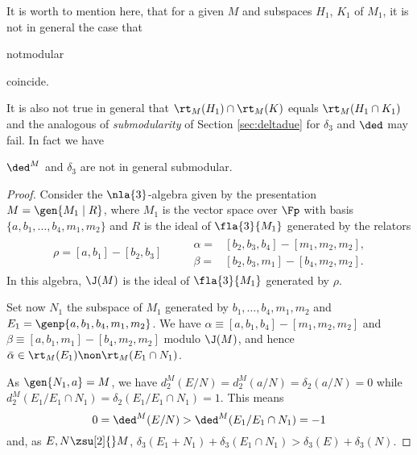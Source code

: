 \smallskip
It is worth to mention here, that for a given $M$ and subspaces $H_{1}$, $K_{1}$ of $M_{1}$, it is not in general the case that
\begin{labeq}{notmodular}
\cap{}\quad{}\quad{}
\end{labeq}
coincide.

It is also not true in general
that $\rt_{M}(H_{1})\cap\rt_{M}(K)$ equals $\rt_{M}(H_{1}\cap K_{1})$ and the analogous of {\em submodularity} 
of Section \ref{sec:deltadue} for
$\delta_{3}$ and $\ded$ may fail. In fact we have
\begin{rem}\label{nossummo}
$\ded^{M}$ and $\delta_{3}$ are not in general submodular.
\end{rem}
\begin{proof}
Consider the $\nla{3}$-algebra given by the presentation $M=\gen{M_{1}\mid R}$, where $M_{1}$ is the vector space over $\Fp$ with
basis $\{a,b_{1},\dots,b_{4},m_{1},m_{2}\}$ and $R$ is the ideal of $\fla{3}{M_{1}}$ generated by the relators
\begin{gather}
\begin{split}
\rho=[a,b_{1}]-[b_{2},b_{3}]
\end{split}\qquad
\begin{split}
\alpha=&[b_{2},b_{3},b_{4}]-[m_{1},m_{2},m_{2}],\\
\beta=&[b_{2},b_{3},m_{1}]-[b_{4},m_{2},m_{2}].
\end{split}
\end{gather}
In this algebra, $\J(M)$ is the ideal of $\fla{3}{M_{1}}$ generated by $\rho$.

Set now $N_{1}$ the subspace of $M_{1}$ generated by $b_{1},\dots,b_{4},m_{1},m_{2}$ and $E_{1}=\genp{a,b_{1},b_{4},m_{1},
m_{2}}$. We have $\alpha\equiv[a,b_{1},b_{4}]-[m_{1},m_{2},m_{2}]$ and $\beta\equiv[a,b_{1},m_{1}]-[b_{4},m_{2},m_{2}]$ modulo
$\J(M)$, and hence $\bar\alpha\in\rt_{M}(E_{1})\non\rt_{M}(E_{1}\cap N_{1})$.

As $\gen{N_{1},a}=M$, we have $d_{2}^{M}(E/N)=d_{2}^{M}(a/N)=\delta_{2}(a/N)=0$ while $d_{2}^{M}(E_{1}/E_{1}\cap N_{1})=
\delta_{2}(E_{1}/E_{1}\cap N_{1})=1$. This means
$$0=\ded^{M}(E/N)>\ded^{M}(E_{1}/E_{1}\cap N_{1})=-1$$
and, as $E,N\zsu[2]{}M$, $\delta_{3}(E_{1}+N_{1})+\delta_{3}(E_{1}\cap N_{1})>\delta_{3}(E)+\delta_{3}(N)$.
\end{proof}


